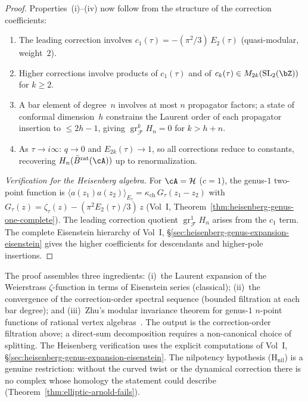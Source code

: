 \begin{proof}
Properties~(i)--(iv) now follow from the structure of the correction
coefficients:
\begin{enumerate}[label=(\roman*)]
\item The leading correction involves $c_1(\tau) = -(\pi^2/3)\,E_2(\tau)$
(quasi-modular, weight~$2$).
\item Higher corrections involve products of $c_1(\tau)$ and of
$c_k(\tau) \in M_{2k}(\mathrm{SL}_2(\bZ))$ for $k \geq 2$.
\item A bar element of degree~$n$ involves at most $n$ propagator
factors; a state of conformal dimension~$h$ constrains the Laurent
order of each propagator insertion to $\leq 2h - 1$, giving
$\operatorname{gr}^k_{\mathcal F}H_n=0$ for $k > h+n$.
\item As $\tau \to i\infty$: $q \to 0$ and $E_{2k}(\tau) \to 1$, so all
corrections reduce to constants, recovering $H_n(\bar{B}^{\mathrm{rat}}(\cA))$
up to renormalization.
\end{enumerate}

\emph{Verification for the Heisenberg algebra.}
For $\cA = \mathcal{H}$ ($c = 1$), the genus-$1$ two-point function is
$\langle a(z_1)a(z_2)\rangle_{E_\tau} = \kappa_{\mathrm{ch}}\,G_\tau(z_1 - z_2)$
with $G_\tau(z) = \zeta_\tau(z) - (\pi^2 E_2(\tau)/3)\,z$
(Vol~I, Theorem~\ref{thm:heisenberg-genus-one-complete}). The leading
correction quotient $\operatorname{gr}^1_{\mathcal F}H_n$ arises from the
$c_1$ term. The complete Eisenstein hierarchy of
Vol~I, \S\ref{sec:heisenberg-genus-expansion-eisenstein} gives
the higher coefficients for descendants and higher-pole insertions.
\end{proof}

\begin{remark}[Scope]
The proof assembles three ingredients:
(i)~the Laurent expansion of the Weierstrass $\zeta$-function in
terms of Eisenstein series (classical);
(ii)~the convergence of the correction-order spectral sequence
(bounded filtration at each bar degree); and
(iii)~Zhu's modular invariance theorem for genus-$1$ $n$-point
functions of rational vertex algebras~\cite{Zhu96}. The output is the
correction-order filtration above; a direct-sum decomposition requires
a non-canonical choice of splitting.
The Heisenberg verification uses the explicit computations of
Vol~I, \S\ref{sec:heisenberg-genus-expansion-eisenstein}.
The nilpotency hypothesis \textup{(H$_{\mathrm{nil}}$)} is a genuine
restriction: without the curved twist or the dynamical correction
there is no complex whose homology the statement could describe
(Theorem~\ref{thm:elliptic-arnold-fails}).
\end{remark}



